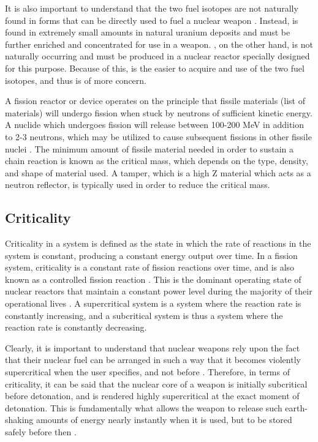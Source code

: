 \documentclass{report}
\begin{document}
It is also important to understand that the two fuel isotopes are not naturally found in forms that can be directly used to fuel a nuclear weapon \cite{Benedict1981,Lewis2008}. Instead,  is found in extremely small amounts in natural uranium deposits and must be further enriched and concentrated for use in a weapon. , on the other hand, is not naturally occurring and must be produced in a nuclear reactor specially designed for this purpose. Because of this,  is the easier to acquire and use of the two fuel isotopes, and thus is of more concern. 




A fission reactor or device operates on the principle that fissile materials (list of materials) will undergo fission when stuck by neutrons of sufficient kinetic energy. A nuclide which undergoes fission will release between 100-200 MeV in addition to 2-3 neutrons, which may be utilized to cause subsequent fissions in other fissile nuclei \cite{krane1987introductory}. The minimum amount of fissile material needed in order to sustain a chain reaction is known as the critical mass, which depends on the type, density, and shape of material used. A tamper, which is a high Z material which acts as a neutron reflector, is typically used in order to reduce the critical mass. 

\subsection{Criticality}

Criticality in a system is defined as the state in which the rate of reactions in the system is constant, producing a constant energy output over time. In a fission system, criticality is a constant rate of fission reactions over time, and is also known as a controlled fission reaction \cite{Duderstadt1976}. This is the dominant operating state of nuclear reactors that maintain a constant power level during the majority of their operational lives \cite{Ott1983}. A supercritical system is a system where the reaction rate is constantly increasing, and a subcritical system is thus a system where the reaction rate is constantly decreasing. 

Clearly, it is important to understand that nuclear weapons rely upon the fact that their nuclear fuel can be arranged in such a way that it becomes violently supercritical when the user specifies, and not before \cite{Lewis2008}. Therefore, in terms of criticality, it can be said that the nuclear core of a weapon is initially subcritical before detonation, and  is rendered highly supercritical at the exact moment of detonation. This is fundamentally what allows the weapon to release such earth-shaking amounts of energy nearly instantly when it is used, but to be stored safely before then \cite{Prussin2014,Defense1998}. 
\end{document}
